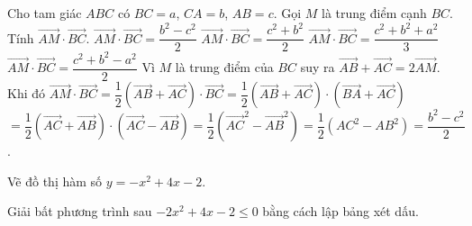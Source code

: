 \begin{ex}%
Cho tam giác $ABC$ có $BC=a$, $CA=b$, $AB=c$. Gọi $M$ là trung điểm cạnh $BC$. Tính $\overrightarrow{AM}\cdot\overrightarrow{BC}$.
\choice
{\True $\overrightarrow{AM}\cdot\overrightarrow{BC}=\dfrac{b^2-c^2}{2}$}
{$\overrightarrow{AM}\cdot\overrightarrow{BC}=\dfrac{c^2+b^2}{2}$}  { $\overrightarrow{AM}\cdot\overrightarrow{BC}=\dfrac{c^2+b^2+a^2}{3}$}
{$\overrightarrow{AM}\cdot\overrightarrow{BC}=\dfrac{c^2+b^2-a^2}{2}$}
\loigiai
{Vì $M$ là trung điểm của $BC$ suy ra $\overrightarrow{AB}+\overrightarrow{AC}=2\overrightarrow{AM}$. \\
Khi đó $\overrightarrow{AM}\cdot\overrightarrow{BC}=\dfrac{1}{2}(\overrightarrow{AB}+\overrightarrow{AC} )\cdot\overrightarrow{BC}=\dfrac{1}{2}(\overrightarrow{AB}+\overrightarrow{AC} )\cdot(\overrightarrow{BA}+\overrightarrow{AC} )$\\
$=\dfrac{1}{2}(\overrightarrow{AC}+\overrightarrow{AB} )\cdot(\overrightarrow{AC}-\overrightarrow{AB} )=\dfrac{1}{2}({{\overrightarrow{AC}}^2}-\overrightarrow{AB}^2 )=\dfrac{1}{2}(AC^2-AB^2 )=\dfrac{b^2-c^2}{2}$. }
\end{ex}


\begin{ex}[1,0 điểm]
Vẽ đồ thị hàm số $y=-x^2+4x-2$.
\end{ex}

\begin{ex}[0,5 điểm]%
Giải bất phương trình sau $-2x^2+4x-2\le 0$ bằng cách lập bảng xét dấu.
\end{ex}

